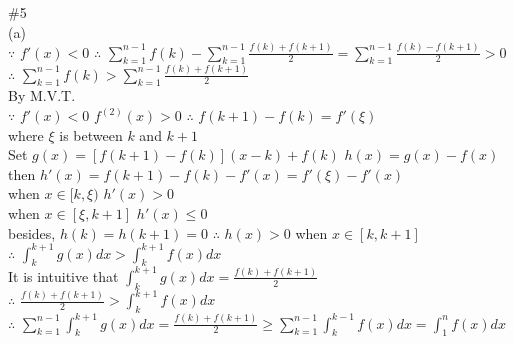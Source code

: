 \documentclass{article}
\begin{document}
\vskip 3cm

\textcolor[rgb]{0.00,0.00,0.50}{\#5}\\

(a)\\

$\because$ \qquad $f'(x) < 0$ \qquad $\therefore$ \qquad $\displaystyle \sum \limits_{k=1}^{n-1} f(k) - \sum \limits_{k=1}^{n-1} \frac{f(k) + f(k+1)}{2} = \sum \limits_{k=1}^{n-1} \frac{f(k) - f(k+1)}{2} > 0$\\

$\therefore$ \qquad $\displaystyle \sum \limits_{k=1}^{n-1} f(k) > \sum \limits_{k=1}^{n-1} \frac{f(k) + f(k+1)}{2}$\\

By M.V.T.\\

$\because$ \qquad $f'(x) < 0$ \qquad $f^{(2)}(x) > 0$ \qquad $\therefore$ \qquad $f(k+1) - f(k) = f'(\xi)$\\

where $\xi$ is between $k$ and $k+1$\\

Set $g(x) = [f(k+1) - f(k)](x-k) + f(k)$ \qquad $h(x) = g(x) - f(x)$\\

then $h'(x) = f(k+1) - f(k) - f'(x) = f'(\xi) - f'(x)$\\

when $x \in [k, \xi)$ \quad $h'(x) > 0$\\

when $x \in [\xi, k+1]$ \quad $h'(x) \leq 0$\\

besides, $h(k) = h(k+1) = 0$ \qquad $\therefore$ \qquad $h(x) > 0$ when $x \in [k, k+1]$\\

$\therefore$ \qquad $\displaystyle \int_k^{k+1} g(x)dx > \int_k^{k+1} f(x)dx$\\

It is intuitive that $\displaystyle \int_k^{k+1} g(x)dx = \frac{f(k) + f(k+1)}{2}$\\

$\therefore$ \qquad $\displaystyle \frac{f(k) + f(k+1)}{2} > \int_k^{k+1}f(x)dx$\\

$\therefore$ \qquad $\displaystyle \sum \limits_{k=1}^{n-1} \displaystyle \int_k^{k+1} g(x)dx = \frac{f(k) + f(k+1)}{2} \geq \sum \limits_{k=1}^{n-1} \int_k^{k-1}f(x)dx = \int_1^n f(x)dx$\\
\end{document}
